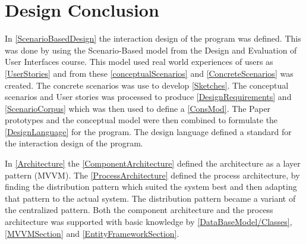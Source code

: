 \chapter{Design Conclusion}
In  \cref{ScenarioBasedDesign} the interaction design of the program was defined. This was done by using the Scenario-Based model from the Design and Evaluation of User Interfaces course. This model used real world experiences of users as  \cref{UserStories} and from these  \cref{conceptualScenarios} and  \cref{ConcreteScenarios} was created. The concrete scenarios was use to develop  \cref{Sketches}. The conceptual scenarios and User stories was processed to produce  \cref{DesignRequirements} and  \cref{ScenarioCorpus} which was then used to define a  \cref{ConsMod}. The Paper prototypes and the conceptual model were then combined to formulate the  \cref{DesignLanguage} for the program. The design language defined a standard for the interaction design of the program.  

In  \cref{Architecture} the  \cref{ComponentArchitecture} defined the architecture as a layer pattern (MVVM). The  \cref{ProcessArchitecture} defined the process architecture, by finding the distribution pattern which suited the system best and then adapting that pattern to the actual system. The distribution pattern became a variant of the centralized pattern. Both the component architecture and the process architecture was supported with basic knowledge by \cref{DataBaseModel/Classes}, \cref{MVVMSection} and \cref{EntityFrameworkSection}.   

